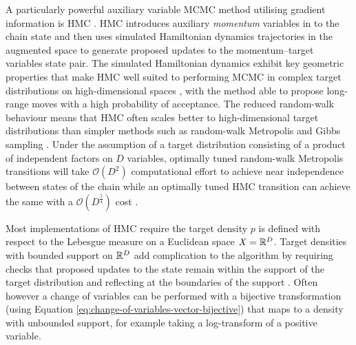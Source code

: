 A particularly powerful auxiliary variable \ac{MCMC} method utilising gradient information is \ac{HMC} \citep{duane1987hybrid,neal2011mcmc}. \ac{HMC} introduces auxiliary \emph{momentum} variables in to the chain state and then uses simulated Hamiltonian dynamics trajectories in the augmented space to generate proposed updates to the momentum--target variables state pair. The simulated Hamiltonian dynamics exhibit key geometric properties that make \ac{HMC} well suited to performing \ac{MCMC} in complex target distributions on high-dimensional spaces \citep{betancourt2017geometric}, with the method able to propose long-range moves with a high probability of acceptance. The reduced random-walk behaviour means that \ac{HMC} often scales better to high-dimensional target distributions than simpler methods such as random-walk Metropolis and Gibbs sampling \citep{betancourt2017conceptual}. Under the assumption of a target distribution consisting of a product of independent factors on $D$ variables, optimally tuned random-walk Metropolis transitions will take $\mathcal{O}(D^2)$ computational effort to achieve near independence between states of the chain while an optimally tuned \ac{HMC} transition can achieve the same with a $\mathcal{O}(D^{\frac{5}{4}})$ cost \citep{neal2011mcmc}.

Most implementations of \ac{HMC} require the target density $p$ is defined with respect to the Lebesgue measure on a Euclidean space $\mathit{X} = \mathbb{R}^D$. Target densities with bounded support on $\mathbb{R}^D$ add complication to the algorithm by requiring checks that proposed updates to the state remain within the support of the target distribution and reflecting at the boundaries of the support \citep{neal2011mcmc}. Often however a change of variables can be performed with a bijective transformation (using Equation \ref{eq:change-of-variables-vector-bijective}) that maps to a density with unbounded support, for example taking a log-transform of a positive variable. %


